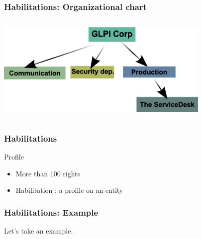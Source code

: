 \documentclass{beamer}
\begin{document}
\begin{frame}
\frametitle{Habilitations: Organizational chart}
\begin{columns}
 \begin{column}{0.45\textwidth}
         \includegraphics[height=4.5cm]{./pics/entites.png}
 \end{column}
 \begin{column}{0.45\textwidth}
 \end{column}
\end{columns}
\end{frame}





\begin{frame}
\frametitle{Habilitations}
    \begin{block}{Profile}
        \begin{itemize}
            \item More than 100 rights
            \item Habilitation : a profile on an entity 
        \end{itemize}
    \end{block}
\end{frame}


\begin{frame}
\frametitle{Habilitations: Example}
Let's take an example.
\end{frame}
\end{document}

